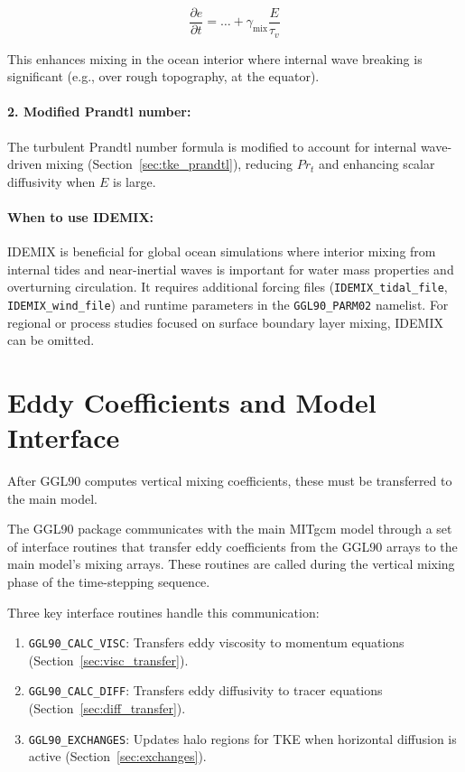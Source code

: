\documentclass[12pt,letterpaper]{article}
\begin{document}
\begin{equation}
\frac{\partial e}{\partial t} = \ldots + \gamma_{\text{mix}} \frac{E}{\tau_v}
\end{equation}

This enhances mixing in the ocean interior where internal wave breaking is significant (e.g., over rough topography, at the equator).

\paragraph{2. Modified Prandtl number:} The turbulent Prandtl number formula is modified to account for internal wave-driven mixing (Section~\ref{sec:tke_prandtl}), reducing $Pr_t$ and enhancing scalar diffusivity when $E$ is large.

\paragraph{When to use IDEMIX:} IDEMIX is beneficial for global ocean simulations where interior mixing from internal tides and near-inertial waves is important for water mass properties and overturning circulation. It requires additional forcing files (\verb|IDEMIX_tidal_file|, \verb|IDEMIX_wind_file|) and runtime parameters in the \verb|GGL90_PARM02| namelist. For regional or process studies focused on surface boundary layer mixing, IDEMIX can be omitted.

\section{Eddy Coefficients and Model Interface}
\label{sec:interface}

After GGL90 computes vertical mixing coefficients, these must be transferred to the main model.

\label{sec:model_interface}

The GGL90 package communicates with the main MITgcm model through a set of interface routines that transfer eddy coefficients from the GGL90 arrays to the main model's mixing arrays. These routines are called during the vertical mixing phase of the time-stepping sequence.

Three key interface routines handle this communication:
\begin{enumerate}
\item \verb|GGL90_CALC_VISC|: Transfers eddy viscosity to momentum equations (Section~\ref{sec:visc_transfer}).
\item \verb|GGL90_CALC_DIFF|: Transfers eddy diffusivity to tracer equations (Section~\ref{sec:diff_transfer}).
\item \verb|GGL90_EXCHANGES|: Updates halo regions for TKE when horizontal diffusion is active (Section~\ref{sec:exchanges}).
\end{enumerate}
\end{document}
